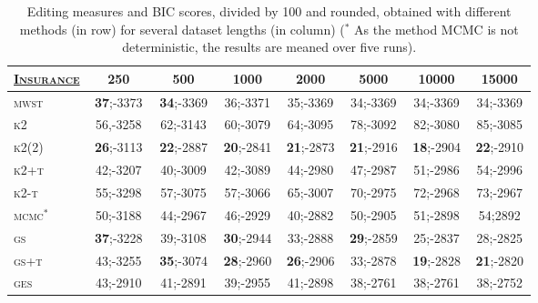 \begin{table}[!t]
\centering
\begin{tabular}{|@{\,}l@{}|c@{\,}c@{\,}c@{\,}c@{\,}c@{\,}c@{\,}c@{\,}|}\hline
\underline{\large\textsc{\textbf{Insurance}}\normalsize} & 250 & 500 & 1000 & 2000 & 5000 & 10000 & 15000\\\hline
\textsc{mwst} & \,\textbf{37};-3373\, & \,\textbf{34};-3369\, & \,36;-3371\, & \,35;-3369\, & \,34;-3369\, & \,34;-3369\, & \,34;-3369\, \\\hline
\textsc{k2}   & 56,-3258 & 62;-3143 & 60;-3079 & 64;-3095 & 78;-3092 & 82;-3080 & 85;-3085 \\
\textsc{k2(2)}& \textbf{26};-3113 & \textbf{22};-2887 & \textbf{20};-2841 & \textbf{21};-2873 & \textbf{21};-2916 & \textbf{18};-2904 & \textbf{22};-2910 \\
\textsc{k2+t} & 42;-3207 & 40;-3009 & 42;-3089 & 44;-2980 & 47;-2987 & 51;-2986 & 54;-2996 \\
\textsc{k2-t} & 55;-3298 & 57;-3075 & 57;-3066 & 65;-3007 & 70;-2975 & 72;-2968 & 73;-2967 \\\hline
\textsc{mcmc}$^*$ & 50;-3188 & 44;-2967 & 46;-2929 & 40;-2882 & 50;-2905 & 51;-2898 & 54;2892 \\\hline
\textsc{gs}   & \textbf{37};-3228 & 39;-3108 & \textbf{30};-2944 & 33;-2888 & \textbf{29};-2859 & 25;-2837 & 28;-2825 \\
\textsc{gs+t} & 43;-3255 & \textbf{35};-3074 & \textbf{28};-2960 & \textbf{26};-2906 & 33;-2878 & \textbf{19};-2828 & \textbf{21};-2820 \\\hline
\textsc{ges}  & 43;-2910 & 41;-2891 & 39;-2955 & 41;-2898 & 38;-2761 & 38;-2761 & 38;-2752 \\\hline
\end{tabular}
\caption{Editing measures and BIC scores, divided by 100 and rounded, obtained with different methods (in row) for several dataset lengths (in column) ($^*$ As the method MCMC is not deterministic, the results are meaned over five runs).}
\label{resinsur}
\end{table}

